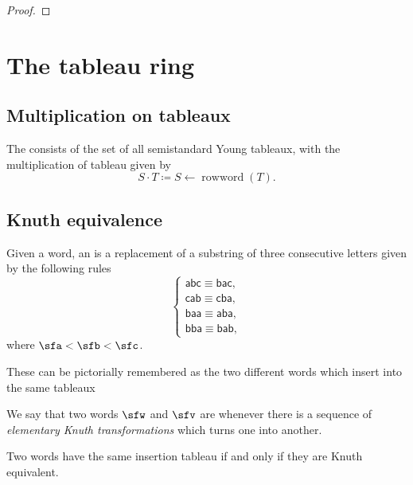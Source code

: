 \documentclass{article}
\DeclareMathOperator{\rowword}{rowword}
\begin{document}
\begin{proof}
\end{proof}

\section{The tableau ring}

\subsection{Multiplication on tableaux}

\begin{definition}
    The  consists of the set of all semistandard Young tableaux, with the multiplication of tableau given by
    \[
        S \cdot T
        \coloneq
        S \leftarrow \rowword (T).
    \]
\end{definition}


\subsection{Knuth equivalence}

\begin{definition}
    Given a word, an  is a replacement of a substring of three consecutive letters given by the following rules
    \[
        \begin{cases}
            \mathsf{abc} \equiv \mathsf{bac}, \\
            \mathsf{cab} \equiv \mathsf{cba}, \\
            \mathsf{baa} \equiv \mathsf{aba}, \\
            \mathsf{bba} \equiv \mathsf{bab},
        \end{cases}
    \]
    where $\sfa < \sfb < \sfc$.
\end{definition}

These can be pictorially remembered as the two different words which insert into the same tableaux

\begin{definition}
    We say that two words $\sfw$ and $\sfv$ are  whenever there is a sequence of \textit{elementary Knuth transformations} which turns one into another.
\end{definition}

\begin{theorem}
    [Knuth]
    Two words have the same insertion tableau if and only if they are Knuth equivalent.
\end{theorem}
\end{document}
